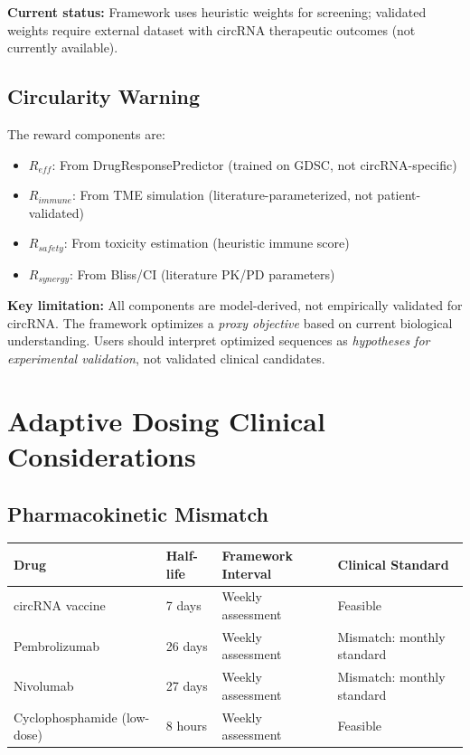 \documentclass{article}
\begin{document}
\textbf{Current status:} Framework uses heuristic weights for screening; validated weights require external dataset with circRNA therapeutic outcomes (not currently available).

\subsection{Circularity Warning}

The reward components are:
\begin{itemize}
\item $R_{eff}$: From DrugResponsePredictor (trained on GDSC, not circRNA-specific)
\item $R_{immune}$: From TME simulation (literature-parameterized, not patient-validated)
\item $R_{safety}$: From toxicity estimation (heuristic immune score)
\item $R_{synergy}$: From Bliss/CI (literature PK/PD parameters)
\end{itemize}

\textbf{Key limitation:} All components are model-derived, not empirically validated for circRNA. The framework optimizes a \textit{proxy objective} based on current biological understanding. Users should interpret optimized sequences as \textit{hypotheses for experimental validation}, not validated clinical candidates.

\section{Adaptive Dosing Clinical Considerations}

\subsection{Pharmacokinetic Mismatch}

\begin{longtable}{llll}
\toprule
Drug & Half-life & Framework Interval & Clinical Standard \\
\midrule
circRNA vaccine & 7 days & Weekly assessment & Feasible \\
Pembrolizumab & 26 days & Weekly assessment & Mismatch: monthly standard \\
Nivolumab & 27 days & Weekly assessment & Mismatch: monthly standard \\
Cyclophosphamide (low-dose) & 8 hours & Weekly assessment & Feasible \\
\bottomrule
\end{longtable}
\end{document}
